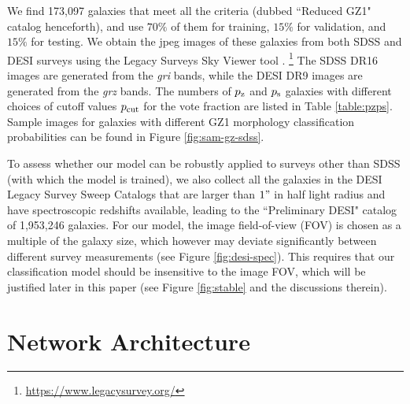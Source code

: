 \documentclass[twocolumn]{aastex631}
\begin{document}
We find 173,097 galaxies that meet all the criteria (dubbed ``Reduced GZ1" catalog henceforth), and use $70\%$ of them for training, $15\%$ for validation, and $15\%$ for testing.
We obtain the jpeg images of these galaxies from both SDSS and DESI surveys using the Legacy Surveys Sky Viewer tool \citep{dey2019overview}.
\footnote{\url{https://www.legacysurvey.org/}}
The SDSS DR16 images are generated from the \textit{gri} bands, while the DESI DR9 images are generated from the \textit{grz} bands.
The numbers of $p_{\rm z}$ and $p_{\rm s}$ galaxies with different choices of cutoff values $p_{\rm cut}$ for the vote fraction are listed in Table \ref{table:pzps}.
Sample images for galaxies with different GZ1 morphology classification probabilities can be found in Figure \ref{fig:sam-gz-sdss}.

To assess whether our model can be robustly applied to surveys other than SDSS (with which the model is trained), we also collect all the galaxies in the DESI Legacy Survey Sweep Catalogs that are larger than $1"$ in half light radius and have spectroscopic redshifts available, leading to the ``Preliminary DESI" catalog of 1,953,246 galaxies.
For our model, the image field-of-view (FOV) is chosen as a multiple of the galaxy size, which however may deviate significantly between different survey measurements (see Figure \ref{fig:desi-spec}).
This requires that our classification model should be insensitive to the image FOV, which will be justified later in this paper (see Figure \ref{fig:stable} and the discussions therein).


\section{Network Architecture}

\label{sec:arch}
\end{document}

